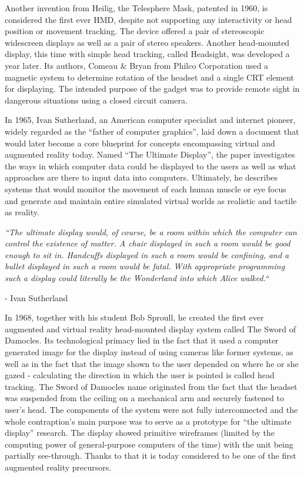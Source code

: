 \documentclass[12pt, a4paper]{article}
\begin{document}

Another invention from Heilig, the Telesphere Mask, patented in 1960, is considered the first ever HMD, despite not supporting any interactivity or head position or movement tracking. The device offered a pair of stereoscopic widescreen displays as well as a pair of stereo speakers. Another head-mounted display, this time with simple head tracking, called Headsight, was developed a year later. Its authors, Comeau \& Bryan from Philco Corporation used a magnetic system to determine rotation of the headset and a single CRT element for displaying. The intended purpose of the gadget was to provide remote sight in dangerous situations using a closed circuit camera.

In 1965, Ivan Sutherland, an American computer specialist and internet pioneer, widely regarded as the “father of computer graphics”, laid down a document that would later become a core blueprint for concepts encompassing virtual and augmented reality today. Named “The Ultimate Display”, the paper investigates the ways in which computer data could be displayed to the users as well as what approaches are there to input data into computers. Ultimately, he describes systems that would monitor the movement of each human muscle or eye focus and generate and maintain entire simulated virtual worlds as realistic and tactile as reality.

\begin{displayquote}
\textit{“The ultimate display would, of course, be a room within which the computer can control the existence of matter. A chair displayed in such a room would be good enough to sit in. Handcuffs displayed in such a room would be confining, and a bullet displayed in such a room would be fatal. With appropriate programming such a display could literally be the Wonderland into which Alice walked.“}
\end{displayquote}
\begin{flushright}
- Ivan Sutherland
\end{flushright}

In 1968, together with his student Bob Sproull, he created the first ever augmented and virtual reality head-mounted display system called The Sword of Damocles. Its technological primacy lied in the fact that it used a computer generated image for the display instead of using cameras like former systems, as well as in the fact that the image shown to the user depended on where he or she gazed - calculating the direction in which the user is pointed is called head tracking. The Sword of Damocles name originated from the fact that the headset was suspended from the ceiling on a mechanical arm and securely fastened to user’s head. The components of the system were not fully interconnected and the whole contraption’s main purpose was to serve as a prototype for “the ultimate display” research. The display showed primitive wireframes (limited by the computing power of general-purpose computers of the time) with the unit being partially see-through. Thanks to that it is today considered to be one of the first augmented reality precursors.
\end{document}
